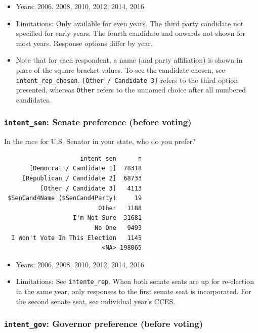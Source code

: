 \documentclass[10pt,article,oneside]{memoir}
\theoremstyle{definition}
\begin{document}
\begin{itemize}
\tightlist
\item
  Years: 2006, 2008, 2010, 2012, 2014, 2016
\item
  Limitations: Only available for even years. The third party candidate
  not specified for early years. The fourth candidate and onwards not
  shown for most years. Response options differ by year.
\item
  Note that for each respondent, a name (and party affiliation) is shown
  in place of the square bracket values. To see the candidate chosen,
  see \texttt{intent\_rep\_chosen}.
  \texttt{{[}Other\ /\ Candidate\ 3{]}} refers to the third option
  presented, whereas \texttt{Other} refers to the unnamed choice after
  all numbered candidates.
\end{itemize}

\subsubsection{\texorpdfstring{\texttt{intent\_sen}: Senate preference
(before
voting)}{intent\_sen: Senate preference (before voting)}}\label{intent_sen-senate-preference-before-voting}

In the race for U.S. Senator in your state, who do you prefer?

\begin{verbatim}
                     intent_sen      n
       [Democrat / Candidate 1]  78318
     [Republican / Candidate 2]  68733
          [Other / Candidate 3]   4113
 $SenCand4Name ($SenCand4Party)     19
                          Other   1188
                   I'm Not Sure  31681
                         No One   9493
  I Won't Vote In This Election   1145
                           <NA> 198065
\end{verbatim}

\begin{itemize}
\tightlist
\item
  Years: 2006, 2008, 2010, 2012, 2014, 2016
\item
  Limitations: See \texttt{intente\_rep}. When both senate seats are up
  for re-election in the same year, only responses to the first senate
  seat is incorporated. For the second senate seat, see individual
  year's CCES.
\end{itemize}

\subsubsection{\texorpdfstring{\texttt{intent\_gov}: Governor preference
(before
voting)}{intent\_gov: Governor preference (before voting)}}\label{intent_gov-governor-preference-before-voting}
\end{document}
